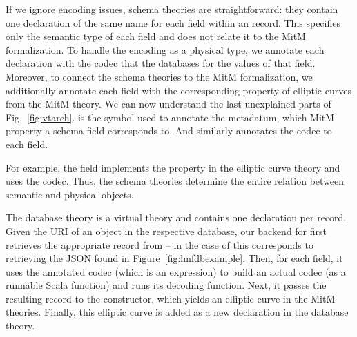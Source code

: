 If we ignore encoding issues, schema theories are straightforward: they contain one declaration of the same name for each field within an \lmfdb record. 
This specifies only the semantic type of each field and does not relate it to the MitM formalization.
To handle the encoding as a physical type, we annotate each declaration with the codec that the databases for the values of that field.
Moreover, to connect the schema theories to the MitM formalization, we additionally annotate each field with the corresponding property of elliptic curves from the MitM theory.
We can now understand the last unexplained parts of Fig.~\ref{fig:vtarch}.
 is the symbol used to annotate the metadatum, which MitM property a schema field corresponds to.
And  similarly annotates the codec to each field.

For example, the  field implements the  property in the elliptic curve theory and uses the  codec.
Thus, the schema theories determine the entire relation between semantic and physical objects.

The database theory is a virtual theory and contains one declaration per \lmfdb record.
Given the URI of an object in the respective database, our \mmt backend for \lmfdb first retrieves the appropriate record from {\lmfdb} -- in the case of  this corresponds to retrieving the JSON found in Figure~\ref{fig:lmfdbexample}. 
Then, for each field, it uses the annotated codec (which is an \ommt expression) to build an actual codec (as a runnable Scala function) and runs its decoding function.
Next, it passes the resulting record to the  constructor, which yields an elliptic curve in the MitM theories.
Finally, this elliptic curve is added as a new declaration in the database theory.



